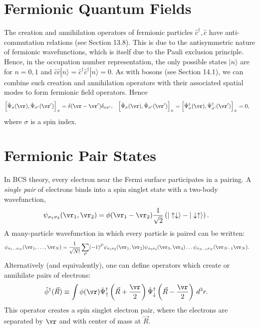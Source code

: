 \documentclass[a4paper, 11pt, normalem]{report}
\begin{document}
\section{Fermionic Quantum Fields}
The creation and annihilation operators of fermionic particles $\hat{c}^\dagger,\hat{c}$ have anti-commutation relations (see Section 13.8).
This is due to the antisymmetric nature of fermionic wavefunctions, which is itself due to the Pauli exclusion principle.
Hence, in the occupation number representation, the only possible states $|n\rangle$ are for $n=0,1$ and $\hat{c}\hat{c}|n\rangle=\hat{c}^\dagger\hat{c}^\dagger|n\rangle=0$.
As with bosons (see Section 14.1), we can combine such creation and annihilation operators with their associated spatial modes to form fermionic field operators. Hence
\begin{align}
    \left[\hat{\Psi}_\sigma(\vr),\hat{\Psi}_{\sigma'}(\vr')\right]_+ &= \delta(\vr-\vr')\delta_{\sigma\sigma'}, & \left[\hat{\Psi}_\sigma(\vr),\hat{\Psi}_{\sigma'}(\vr')\right]_+ &= \left[\hat{\Psi}_\sigma^\dagger(\vr),\hat{\Psi}_{\sigma'}^\dagger(\vr')\right]_+ = 0,
\end{align}
where $\sigma$ is a spin index.

\section{Fermionic Pair States}
In BCS theory, every electron near the Fermi surface participates in a pairing.
A \emph{single pair} of electrons binds into a spin singlet state with a two-body wavefunction,
\begin{align}
    \psi_{\sigma_1\sigma_2}(\vr_1,\vr_2) &= \phi(\vr_1-\vr_2)\frac{1}{\sqrt{2}}\left(|\uparrow\downarrow\rangle-|\downarrow\uparrow\rangle\right).
\end{align}
A many-particle wavefunction in which every particle is paired can be written:
\begin{align}
    \psi_{\sigma_1\dots\sigma_N}(\vr_1,\dots,\vr_N) &= \frac{1}{\sqrt{N!}}\sum_P (-1)^P\psi_{\sigma_1\sigma_2}(\vr_1,\vr_2)\psi_{\sigma_3\sigma_4}(\vr_3,\vr_4)\dots\psi_{\sigma_{N-1}\sigma_N}(\vr_{N-1}\vr_N).
\end{align}
Alternatively (and equivalently), one can define operators which create or annihilate pairs of electrons:
\begin{align}
    \hat{\phi}^\dagger(\vec{R}) &\equiv \int \phi(\vr)\hat{\Psi}_{\uparrow}^\dagger\left(\vec{R}+\frac{\vr}{2}\right)\hat{\Psi}_{\downarrow}^\dagger\left(\vec{R}-\frac{\vr}{2}\right)\,d^3r.
\end{align}
This operator creates a spin singlet electron pair, where the electrons are separated by $\vr$ and with center of mass at $\vec{R}$.
\end{document}
